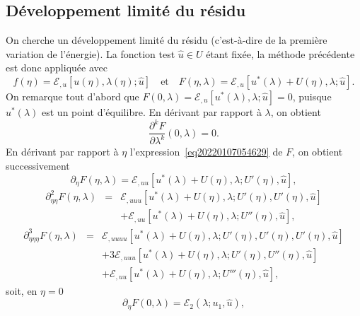 \documentclass[12pt, final]{amsart}
\begin{document}
\subsection{Développement limité du
résidu}\label{sec20211112182000}

On cherche un développement limité du résidu (c'est-{\`a}-dire de
la premi{\`e}re variation de l'énergie). La fonction test $\hat{u} \in U$
étant fixée, la méthode précédente est donc appliquée
avec
\begin{equation}
  \label{eq20220107054629} f (\eta) =\mathcal{E}_{, u} [u (\eta), \lambda
  (\eta) ; \hat{u}] \quad \text{et} \quad F (\eta, \lambda) =\mathcal{E}_{, u}
  [u^{\ast} (\lambda) + U (\eta), \lambda ; \hat{u}] .
\end{equation}
On remarque tout d'abord que $F (0, \lambda) =\mathcal{E}_{, u} [u^{\ast}
(\lambda), \lambda ; \hat{u}] = 0$, puisque $u^{\ast} (\lambda)$ est un point
d'équilibre. En dérivant par rapport {\`a} $\lambda$, on obtient
\begin{equation}
  \label{eq20211112164240} \frac{\partial^k F}{\partial \lambda^k} (0,
  \lambda) = 0.
\end{equation}
En dérivant par rapport {\`a} $\eta$ l'expression~\eqref{eq20220107054629}
de $F$, on obtient successivement
\begin{equation}
  \partial_{\eta} F (\eta, \lambda) =\mathcal{E}_{, u  u} [u^{\ast}
  (\lambda) + U (\eta), \lambda ; U' (\eta), \hat{u}],
\end{equation}
\begin{eqnarray}
  \partial_{\eta  \eta}^2 F (\eta, \lambda) & = & \mathcal{E}_{, u
   u  u} [u^{\ast} (\lambda) + U (\eta), \lambda ; U' (\eta),
  U' (\eta), \hat{u}] \nonumber\\
  &  &  +\mathcal{E}_{, u  u} [u^{\ast} (\lambda) + U
  (\eta), \lambda ; U'' (\eta), \hat{u}],
\end{eqnarray}
\begin{eqnarray}
  \partial_{\eta  \eta  \eta}^3 F (\eta, \lambda) & = &
  \mathcal{E}_{, u  u  u  u} [u^{\ast} (\lambda) + U
  (\eta), \lambda ; U' (\eta), U' (\eta), U' (\eta), \hat{u}] \nonumber\\
  &  &  + 3\mathcal{E}_{, u  u  u} [u^{\ast}
  (\lambda) + U (\eta), \lambda ; U' (\eta), U'' (\eta), \hat{u}] \nonumber\\
  &  &  +\mathcal{E}_{, u  u} [u^{\ast} (\lambda) + U
  (\eta), \lambda ; U''' (\eta), \hat{u}],
\end{eqnarray}
soit, en $\eta = 0$
\begin{equation}
  \partial_{\eta} F (0, \lambda) =\mathcal{E}_2 (\lambda ; u_1, \hat{u}),
\end{equation}
\end{document}
